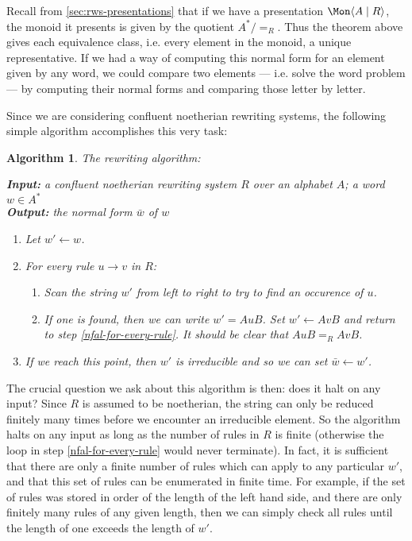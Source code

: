 \documentclass[noindex,noinsetproof,12pt]{lmaths}
\newtheorem{algorithm}[defn]{Algorithm}
\begin{document}
Recall from \cref{sec:rws-presentations} that if we have a presentation $\Mon \langle A \mid R \rangle$, the monoid it presents is given by the quotient $A^*/{=_R}$. Thus the theorem above gives each equivalence class, i.e. every element in the monoid, a unique representative. If we had a way of computing this normal form for an element given by any word, we could compare two elements --- i.e. solve the word problem --- by computing their normal forms and comparing those letter by letter.

Since we are considering confluent noetherian rewriting systems, the following simple algorithm accomplishes this very task:

\begin{algorithm} The rewriting algorithm: \label{alg:rewrite}

\hspace{0.05\textwidth}
\parbox[t]{0.9\textwidth}{
	\textbf{Input:} a confluent noetherian rewriting system $R$ over an alphabet $A$; a word $w \in A^*$ \\
	\textbf{Output:} the normal form $\bar w$ of $w$
	\medskip

	\begin{enumerate}
		\item Let $w' \leftarrow w$.
		\item For every rule $u \to v$ in $R$:	\label{nfal-for-every-rule}
			\begin{enumerate}
				\item Scan the string $w'$ from left to right to try to find an occurence of $u$.
				\item If one is found, then we can write $w' = AuB$. Set $w' \leftarrow AvB$ and return to step \ref{nfal-for-every-rule}. It should be clear that $AuB =_R AvB$.
			\end{enumerate}
		\item If we reach this point, then $w'$ is irreducible and so we can set $\bar w \leftarrow w'$.
	\end{enumerate}
}
\end{algorithm}

The crucial question we ask about this algorithm is then: does it halt on any input? Since $R$ is assumed to be noetherian, the string can only be reduced finitely many times before we encounter an irreducible element. So the algorithm halts on any input as long as the number of rules in $R$ is finite (otherwise the loop in step \ref{nfal-for-every-rule} would never terminate). In fact, it is sufficient that there are only a finite number of rules which can apply to any particular $w'$, and that this set of rules can be enumerated in finite time. For example, if the set of rules was stored in order of the length of the left hand side, and there are only finitely many rules of any given length, then we can simply check all rules until the length of one exceeds the length of $w'$.
\end{document}
